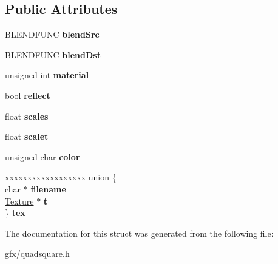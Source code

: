 \subsection*{Public Attributes}
\begin{DoxyCompactItemize}
\item 
B\+L\+E\+N\+D\+F\+U\+NC {\bfseries blend\+Src}\hypertarget{structTerrainTexture_ae5e7109a98c69ed88d55515cb32e514d}{}\label{structTerrainTexture_ae5e7109a98c69ed88d55515cb32e514d}

\item 
B\+L\+E\+N\+D\+F\+U\+NC {\bfseries blend\+Dst}\hypertarget{structTerrainTexture_ae0163e778eb8f0644ec42dbd9545b501}{}\label{structTerrainTexture_ae0163e778eb8f0644ec42dbd9545b501}

\item 
unsigned int {\bfseries material}\hypertarget{structTerrainTexture_a5d10adbfbdf7fd616a87cb1b52f9a77a}{}\label{structTerrainTexture_a5d10adbfbdf7fd616a87cb1b52f9a77a}

\item 
bool {\bfseries reflect}\hypertarget{structTerrainTexture_ac731d1e6d913a43c037fae0de4829a02}{}\label{structTerrainTexture_ac731d1e6d913a43c037fae0de4829a02}

\item 
float {\bfseries scales}\hypertarget{structTerrainTexture_a05f0e97fc2674f6a1f4f507dba617142}{}\label{structTerrainTexture_a05f0e97fc2674f6a1f4f507dba617142}

\item 
float {\bfseries scalet}\hypertarget{structTerrainTexture_a88ed061b13a2823e837de5abc546cd74}{}\label{structTerrainTexture_a88ed061b13a2823e837de5abc546cd74}

\item 
unsigned char {\bfseries color}\hypertarget{structTerrainTexture_ac6ae8c6037d120ad19b5a75bcc04b09b}{}\label{structTerrainTexture_ac6ae8c6037d120ad19b5a75bcc04b09b}

\item 
\begin{tabbing}
xx\=xx\=xx\=xx\=xx\=xx\=xx\=xx\=xx\=\kill
union \{\\
\>char $\ast$ {\bfseries filename}\\
\>\hyperlink{classTexture}{Texture} $\ast$ {\bfseries t}\\
\} {\bfseries tex}\hypertarget{structTerrainTexture_a9bd8cfbfcb90ee9dd50b45db982da868}{}\label{structTerrainTexture_a9bd8cfbfcb90ee9dd50b45db982da868}
\\

\end{tabbing}\end{DoxyCompactItemize}


The documentation for this struct was generated from the following file\+:\begin{DoxyCompactItemize}
\item 
gfx/quadsquare.\+h\end{DoxyCompactItemize}
